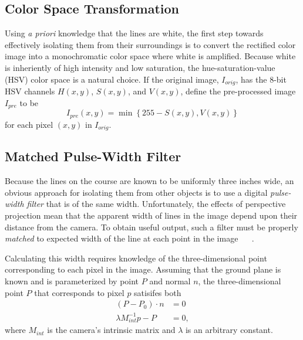 \documentclass[11pt,twocolumn]{article}
\begin{document}
\subsection{Color Space Transformation}
\label{sec:line-color}
Using \textit{a priori} knowledge that the lines are white, the first step
towards effectively isolating them from their surroundings is to convert the
rectified color image into a monochromatic color space where white is
amplified. Because white is inheriently of high intensity and low saturation,
the hue-saturation-value (HSV) color space is a natural choice. If the original
image, $I_{orig}$, has the 8-bit HSV channels $H(x,y)$, $S(x, y)$, and $V(x,
y)$, define the pre-processed image $I_{pre}$ to be
\begin{equation*}
	I_{pre}(x, y) = \min\left\{255 - S(x, y), V(x, y)\right\}
\end{equation*}
for each pixel $(x, y)$ in $I_{orig}$.

\subsection{Matched Pulse-Width Filter}
\label{sec:line-filter}
Because the lines on the course are known to be uniformly three inches wide, an
obvious approach for isolating them from other objects is to use a digital
\textit{pulse-width filter} that is of the same width. Unfortunately, the
effects of perspective projection mean that the apparent width of lines in the
image depend upon their distance from the camera. To obtain useful output, such
a filter must be properly \textit{matched} to expected width of the line at
each point in the image ~\cite{huang_thesis} ~\cite{huang_paper}.

Calculating this width requires knowledge of the three-dimensional point
corresponding to each pixel in the image. Assuming that the ground plane is
known and is parameterized by point $P$ and normal $n$, the three-dimensional
point $P$ that corresponds to pixel $p$ satisifes both
\begin{align*}
	(P - P_0) \cdot n          &= 0 \\
	\lambda M^{-1}_{int} p - P &= 0,
\end{align*}
where $M_{int}$ is the camera's intrinsic matrix and $\lambda$ is an arbitrary
constant.
\end{document}
